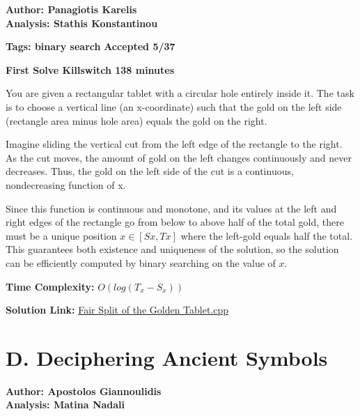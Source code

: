 \documentclass{article}
\begin{document}
    \textbf{Author: Panagiotis Karelis}\\
    \textbf{Analysis: Stathis Konstantinou}
    
    \vspace{2em}
    
    \noindent \textbf{Tags: binary search} \hfill \textbf{Accepted 5/37}
    
    \hfill \textbf{First Solve Killswitch 138 minutes}
    
    \vspace{2em}
    
    \noindent You are given a rectangular tablet with a circular hole entirely inside it. The task is to choose a vertical line (an x-coordinate) such that the gold on the left side (rectangle area minus hole area) equals the gold on the right.
    
    \noindent Imagine sliding the vertical cut from the left edge of the rectangle to the right. As the cut moves, the amount of gold on the left changes continuously and never decreases. Thus, the gold on the left side of the cut is a continuous, nondecreasing function of x.
    
    \noindent Since this function is continuous and monotone, and its values at the left and right edges of the rectangle go from below to above half of the total gold, there must be a unique position $ x \in [Sx,Tx] $ where the left-gold equals half the total. This guarantees both existence and uniqueness of the solution, so the solution can be efficiently computed by binary searching on the value of $x$.
    
    
    \vspace{1em}
    \noindent \textbf{Time Complexity:}
    $O(log{(T_x - S_x)})$
    \vspace{1em}
    
    \noindent \textbf{Solution Link:} 
    \href{https://github.com/StathisKons/GRCPC-2024-Editorial-Implementations/blob/main/C.%20Fair%20Split%20of%20the%20Golden%20Tablet.cpp}{Fair Split of the Golden Tablet.cpp}
    
\newpage

\vspace{5em}

\section*{D. Deciphering Ancient Symbols}

\textbf{Author: Apostolos Giannoulidis}\\
\textbf{Analysis: Matina Nadali}
\end{document}

